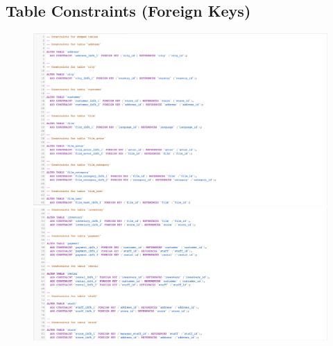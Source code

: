\documentclass[openany]{article}
\begin{document}
\subsection{Table Constraints (Foreign Keys)}
	\begin{figure}[H]
		\includegraphics[width=\textwidth]{tableconstraints1}
		\includegraphics[width=\textwidth]{tableconstraints2}
	\end{figure}
\end{document}

